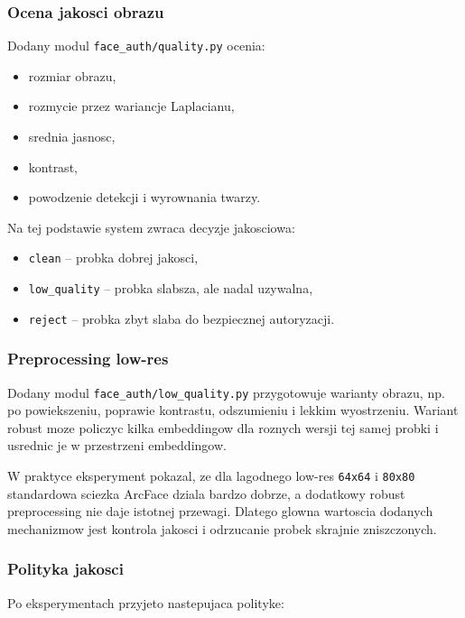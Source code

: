 \documentclass[12pt]{article}
\begin{document}
\subsubsection{Ocena jakosci obrazu}

Dodany modul \texttt{face\_auth/quality.py} ocenia:

\begin{itemize}
    \item rozmiar obrazu,
    \item rozmycie przez wariancje Laplacianu,
    \item srednia jasnosc,
    \item kontrast,
    \item powodzenie detekcji i wyrownania twarzy.
\end{itemize}

Na tej podstawie system zwraca decyzje jakosciowa:

\begin{itemize}
    \item \texttt{clean} -- probka dobrej jakosci,
    \item \texttt{low\_quality} -- probka slabsza, ale nadal uzywalna,
    \item \texttt{reject} -- probka zbyt slaba do bezpiecznej autoryzacji.
\end{itemize}

\subsubsection{Preprocessing low-res}

Dodany modul \texttt{face\_auth/low\_quality.py} przygotowuje warianty obrazu, np. po powiekszeniu, poprawie kontrastu, odszumieniu i lekkim wyostrzeniu. Wariant robust moze policzyc kilka embeddingow dla roznych wersji tej samej probki i usrednic je w przestrzeni embeddingow.

W praktyce eksperyment pokazal, ze dla lagodnego low-res \texttt{64x64} i \texttt{80x80} standardowa sciezka ArcFace dziala bardzo dobrze, a dodatkowy robust preprocessing nie daje istotnej przewagi. Dlatego glowna wartoscia dodanych mechanizmow jest kontrola jakosci i odrzucanie probek skrajnie zniszczonych.

\subsubsection{Polityka jakosci}

Po eksperymentach przyjeto nastepujaca polityke:
\end{document}
